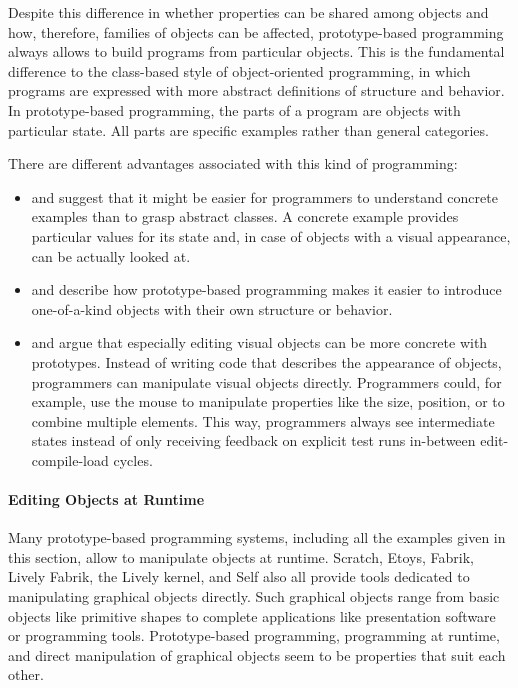 Despite this difference in whether properties can be shared among objects and how, therefore, families of objects can be affected, prototype-based programming always allows to build programs from particular objects.
This is the fundamental difference to the class-based style of object-oriented programming, in which programs are expressed with more abstract definitions of structure and behavior.
In prototype-based programming, the parts of a program are objects with particular state.
All parts are specific examples rather than general categories.

There are different advantages associated with this kind of programming:
\begin{itemize}
    \item \cite{Taivalsaari1996CVP} and \cite{Ungar1987SPS} suggest that it might be easier for programmers to understand concrete examples than to grasp abstract classes. A concrete example provides particular values for its state and, in case of objects with a visual appearance, can be actually looked at.
    \item \cite{Ungar1987SPS} and \cite{Borning1986CVP} describe how prototype-based programming makes it easier to introduce one-of-a-kind objects with their own structure or behavior.
    \item \cite{Borning1986CVP} and \cite{Maloney1995Mor} argue that especially editing visual objects can be more concrete with prototypes. Instead of writing code that describes the appearance of objects, programmers can manipulate visual objects directly. Programmers could, for example, use the mouse to manipulate properties like the size, position, or to combine multiple elements. This way, programmers always see intermediate states instead of only receiving feedback on explicit test runs in-between edit-compile-load cycles. 
\end{itemize}

\paragraph{Editing Objects at Runtime}
Many prototype-based programming systems, including all the examples given in this section, allow to manipulate objects at runtime.
Scratch, Etoys, Fabrik, Lively Fabrik, the Lively kernel, and Self also all provide tools dedicated to manipulating graphical objects directly.
Such graphical objects range from basic objects like primitive shapes to complete applications like presentation software or programming tools.
Prototype-based programming, programming at runtime, and direct manipulation of graphical objects seem to be properties that suit each other.


